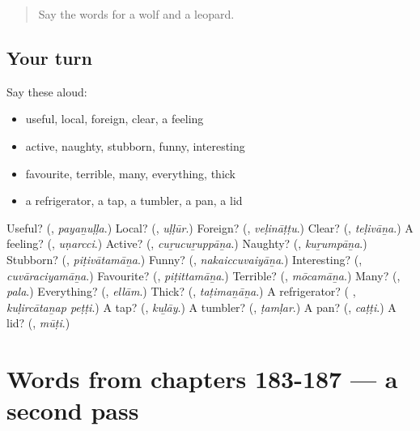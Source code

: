 \begin{quote}
Say the words for a wolf and a leopard.
\end{quote}

\subsection*{Your turn}
Say these aloud:

\begin{itemize}
\raggedright
  \item useful, local, foreign, clear, a feeling
  \item active, naughty, stubborn, funny, interesting
  \item favourite, terrible, many, everything, thick
  \item a refrigerator, a tap, a tumbler, a pan, a lid
\end{itemize}

\begin{tcolorbox}[breakable,colback=teal!4,colframe=teal!35!black,title={Before you move on}]
Useful? (\textbf{}, \emph{payaṉuḷḷa}.) Local? (\textbf{}, \emph{uḷḷūr}.) Foreign? (\textbf{}, \emph{veḷināṭṭu}.) Clear? (\textbf{}, \emph{teḷivāṉa}.) A feeling? (\textbf{}, \emph{uṇarcci}.) Active? (\textbf{}, \emph{cuṟucuṟuppāṉa}.) Naughty? (\textbf{}, \emph{kuṟumpāṉa}.) Stubborn? (\textbf{}, \emph{piṭivātamāṉa}.) Funny? (\textbf{}, \emph{nakaiccuvaiyāṉa}.) Interesting? (\textbf{}, \emph{cuvāraciyamāṉa}.) Favourite? (\textbf{}, \emph{piṭittamāṉa}.) Terrible? (\textbf{}, \emph{mōcamāṉa}.) Many? (\textbf{}, \emph{pala}.) Everything? (\textbf{}, \emph{ellām}.) Thick? (\textbf{}, \emph{taṭimaṉāṉa}.) A refrigerator? (\textbf{ }, \emph{kuḷircātaṉap peṭṭi}.) A tap? (\textbf{}, \emph{kuḻāy}.) A tumbler? (\textbf{}, \emph{ṭamḷar}.) A pan? (\textbf{}, \emph{caṭṭi}.) A lid? (\textbf{}, \emph{mūṭi}.)
\end{tcolorbox}
\section[(dialogue)]{Words from chapters 183-187 — a second pass}

\label{lesson:TA-R187-second-pass-words-from-chapters-183-187}



